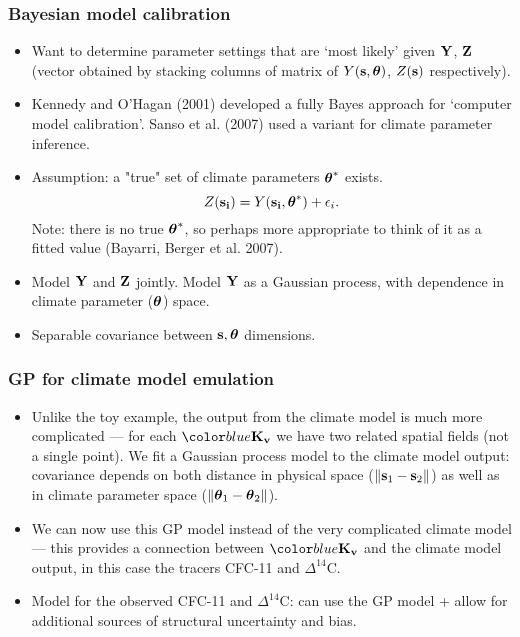 \documentclass{beamer}
\begin{document}
\begin{frame}
 \frametitle{Bayesian model calibration   }
 \begin{itemize}
 	\item Want to determine parameter settings that are `most likely' given ${\bf Y}$, ${\bf Z}$ (vector obtained by stacking columns of matrix of $Y({\bf s},\mbox{\boldmath $\theta$})$, $Z({\bf s})$ respectively). 
        \item Kennedy and O'Hagan (2001) developed a fully Bayes
          approach for `computer model calibration'.  Sanso et
          al. (2007) used a variant for climate parameter inference.
        \item  Assumption: a "true" set of climate parameters $\mbox{\boldmath $\theta$}^*$ exists. 
	$$Z(\mathbf{s_i})=Y(\mathbf{s_i},\mbox{\boldmath $\theta$}^*)+\epsilon_i.$$ Note: there is no true $\mbox{\boldmath $\theta$}^*$, so perhaps more appropriate to think of it as a fitted value (Bayarri, Berger et al. 2007). %
      \item Model ${\bf Y}$ and ${\bf Z}$ jointly.  Model ${\bf Y}$ as a Gaussian
        process, with dependence in climate parameter ($\mbox{\boldmath $\theta$}$) space.
      \item Separable covariance between ${\bf s}, \mbox{\boldmath $\theta$}$ dimensions.
      \end{itemize}
    \end{frame}

\begin{frame}
\frametitle{GP for climate model emulation }

\begin{itemize}
\item Unlike the toy example, the output from the climate model is
  much more complicated --- for each $\Kv$ we have two related spatial
  fields (not a single point).  We fit a Gaussian process model to the
  climate model output: covariance depends on both distance in
  physical space ($\lVert {\bf s}_1-{\bf s}_2 \rVert$) as well as in climate
  parameter space ($\lVert \mbox{\boldmath $\theta$}_1-\mbox{\boldmath $\theta$}_2 \rVert$).
\item We can now use this GP model instead of the very complicated climate
model --- this provides a connection between $\Kv$ and the climate
model output, in this case the tracers CFC-11 and $\Delta^{14}$C. 
\item Model for the observed CFC-11 and $\Delta^{14}$C: can use the GP model +
  allow for additional sources of structural uncertainty and bias.
\end{itemize}
\end{frame}
\end{document}
